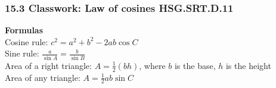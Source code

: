 

\fancyhead[LE]{\thepage}



\subsubsection*{15.3 Classwork: Law of cosines \hfill HSG.SRT.D.11}
\textbf{Formulas}\\[0.25cm]
Cosine rule: $c^2=a^2+b^2-2ab \cos C$\\[0.25cm]
Sine rule: $\displaystyle \frac{a}{\sin A} = \frac{b}{\sin B}$\\[0.25cm]
Area of a right triangle: $\displaystyle A=\frac{1}{2}(bh)$, where $b$ is the base, $h$ is the height\\[0.25cm]
Area of any triangle: $\displaystyle A=\frac{1}{2}ab \sin C$

